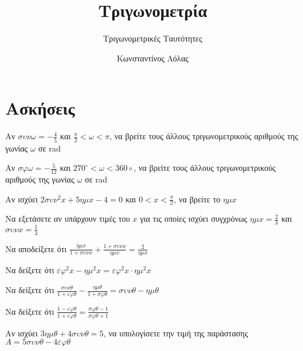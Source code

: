 \documentclass{../presentation}
\title{Τριγωνομετρία}
\subtitle{Τριγωνομετρικές Ταυτότητες}
\author[Λόλας]{Κωνσταντίνος Λόλας}
\date{}
\begin{document}
\begin{frame}
  \titlepage
\end{frame}

\section{Ασκήσεις}
\begin{askisi}
  Αν $συνω=-\frac{4}{5}$ και $\frac{π}{2}<ω<π$, να βρείτε τους άλλους τριγωνομετρικούς αριθμούς της γωνίας $ω$ σε rad

\end{askisi}

\begin{askisi}
  Αν $σφω=-\frac{5}{12}$ και $270^{\circ}<ω<360{\circ}$, να βρείτε τους άλλους τριγωνομετρικούς αριθμούς της γωνίας $ω$ σε rad

\end{askisi}

\begin{askisi}
  Αν ισχύει $2συν^2x+5ημx-4=0$ και $0<x<\frac{π}{2}$, να βρείτε το $ημx$

\end{askisi}

\begin{askisi}
  Να εξετάσετε αν υπάρχουν τιμές του $x$ για τις οποίες ισχύει συγχρόνως $ημx=\frac{2}{3}$ και $συνx=\frac{1}{3}$
\end{askisi}

\begin{askisi}
  Να αποδείξετε ότι $\frac{ημx}{1+συνx}+\frac{1+συνx}{ημx}=\frac{2}{ημx}$

\end{askisi}

\begin{askisi}
  Να δείξετε ότι $εφ^2x-ημ^2x=εφ^2x\cdot ημ^2x$

\end{askisi}

\begin{askisi}
  Να δείξετε ότι $\frac{συνθ}{1+εφθ}-\frac{ημθ}{1+σφθ}=συνθ-ημθ$

\end{askisi}

\begin{askisi}
  Να δείξετε ότι $\frac{1-εφθ}{1+εφθ}=\frac{σφθ-1}{σφθ+1}$

\end{askisi}

\begin{askisi}
  Αν ισχύει $3ημθ+4συνθ=5$, να υπολογίσετε την τιμή της παράστασης $Α=5συνθ-4εφθ$

\end{askisi}
\end{document}
